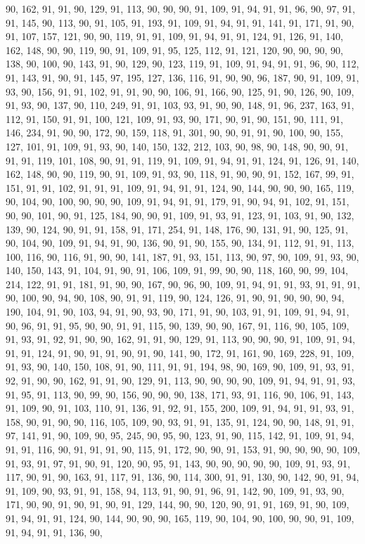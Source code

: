 \begin{sloppypar}
90, 162, 91, 91, 90, 129, 91, 113, 90, 90, 90, 91, 109, 91, 94, 91, 91, 96, 90, 97, 91, 91, 145, 90, 113, 90, 91, 105, 91, 193, 91, 109, 91, 94, 91, 91, 141, 91, 171, 91, 90, 91, 107, 157, 121, 90, 90, 119, 91, 91, 109, 91, 94, 91, 91, 124, 91, 126, 91, 140, 162, 148, 90, 90, 119, 90, 91, 109, 91, 95, 125, 112, 91, 121, 120, 90, 90, 90, 90, 138, 90, 100, 90, 143, 91, 90, 129, 90, 123, 119, 91, 109, 91, 94, 91, 91, 96, 90, 112, 91, 143, 91, 90, 91, 145, 97, 195, 127, 136, 116, 91, 90, 90, 96, 187, 90, 91, 109, 91, 93, 90, 156, 91, 91, 102, 91, 91, 90, 90, 106, 91, 166, 90, 125, 91, 90, 126, 90, 109, 91, 93, 90, 137, 90, 110, 249, 91, 91, 103, 93, 91, 90, 90, 148, 91, 96, 237, 163, 91, 112, 91, 150, 91, 91, 100, 121, 109, 91, 93, 90, 171, 90, 91, 90, 151, 90, 111, 91, 146, 234, 91, 90, 90, 172, 90, 159, 118, 91, 301, 90, 90, 91, 91, 90, 100, 90, 155, 127, 101, 91, 109, 91, 93, 90, 140, 150, 132, 212, 103, 90, 98, 90, 148, 90, 90, 91, 91, 91, 119, 101, 108, 90, 91, 91, 119, 91, 109, 91, 94, 91, 91, 124, 91, 126, 91, 140, 162, 148, 90, 90, 119, 90, 91, 109, 91, 93, 90, 118, 91, 90, 90, 91, 152, 167, 99, 91, 151, 91, 91, 102, 91, 91, 91, 109, 91, 94, 91, 91, 124, 90, 144, 90, 90, 90, 165, 119, 90, 104, 90, 100, 90, 90, 90, 109, 91, 94, 91, 91, 179, 91, 90, 94, 91, 102, 91, 151, 90, 90, 101, 90, 91, 125, 184, 90, 90, 91, 109, 91, 93, 91, 123, 91, 103, 91, 90, 132, 139, 90, 124, 90, 91, 91, 158, 91, 171, 254, 91, 148, 176, 90, 131, 91, 90, 125, 91, 90, 104, 90, 109, 91, 94, 91, 90, 136, 90, 91, 90, 155, 90, 134, 91, 112, 91, 91, 113, 100, 116, 90, 116, 91, 90, 90, 141, 187, 91, 93, 151, 113, 90, 97, 90, 109, 91, 93, 90, 140, 150, 143, 91, 104, 91, 90, 91, 106, 109, 91, 99, 90, 90, 118, 160, 90, 99, 104, 214, 122, 91, 91, 181, 91, 90, 90, 167, 90, 96, 90, 109, 91, 94, 91, 91, 93, 91, 91, 91, 90, 100, 90, 94, 90, 108, 90, 91, 91, 119, 90, 124, 126, 91, 90, 91, 90, 90, 90, 94, 190, 104, 91, 90, 103, 94, 91, 90, 93, 90, 171, 91, 90, 103, 91, 91, 109, 91, 94, 91, 90, 96, 91, 91, 95, 90, 90, 91, 91, 115, 90, 139, 90, 90, 167, 91, 116, 90, 105, 109, 91, 93, 91, 92, 91, 90, 90, 162, 91, 91, 90, 129, 91, 113, 90, 90, 90, 91, 109, 91, 94, 91, 91, 124, 91, 90, 91, 91, 90, 91, 90, 141, 90, 172, 91, 161, 90, 169, 228, 91, 109, 91, 93, 90, 140, 150, 108, 91, 90, 111, 91, 91, 194, 98, 90, 169, 90, 109, 91, 93, 91, 92, 91, 90, 90, 162, 91, 91, 90, 129, 91, 113, 90, 90, 90, 90, 109, 91, 94, 91, 91, 93, 91, 95, 91, 113, 90, 99, 90, 156, 90, 90, 90, 138, 171, 93, 91, 116, 90, 106, 91, 143, 91, 109, 90, 91, 103, 110, 91, 136, 91, 92, 91, 155, 200, 109, 91, 94, 91, 91, 93, 91, 158, 90, 91, 90, 90, 116, 105, 109, 90, 93, 91, 91, 135, 91, 124, 90, 90, 148, 91, 91, 97, 141, 91, 90, 109, 90, 95, 245, 90, 95, 90, 123, 91, 90, 115, 142, 91, 109, 91, 94, 91, 91, 116, 90, 91, 91, 91, 90, 115, 91, 172, 90, 90, 91, 153, 91, 90, 90, 90, 90, 109, 91, 93, 91, 97, 91, 90, 91, 120, 90, 95, 91, 143, 90, 90, 90, 90, 90, 109, 91, 93, 91, 117, 90, 91, 90, 163, 91, 117, 91, 136, 90, 114, 300, 91, 91, 130, 90, 142, 90, 91, 94, 91, 109, 90, 93, 91, 91, 158, 94, 113, 91, 90, 91, 96, 91, 142, 90, 109, 91, 93, 90, 171, 90, 90, 91, 90, 91, 90, 91, 129, 144, 90, 90, 120, 90, 91, 91, 169, 91, 90, 109, 91, 94, 91, 91, 124, 90, 144, 90, 90, 90, 165, 119, 90, 104, 90, 100, 90, 90, 91, 109, 91, 94, 91, 91, 136, 90, 
\end{sloppypar}
